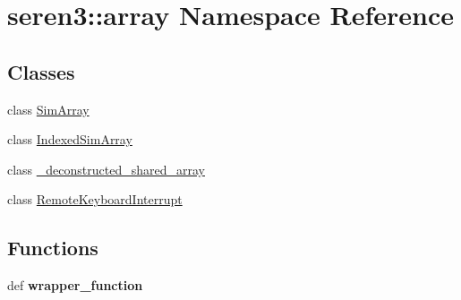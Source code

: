 \hypertarget{namespaceseren3_1_1array}{
\section{seren3::array Namespace Reference}
\label{namespaceseren3_1_1array}
}
\subsection*{Classes}
\begin{DoxyCompactItemize}
\item 
class \hyperlink{classseren3_1_1array_1_1SimArray}{SimArray}
\item 
class \hyperlink{classseren3_1_1array_1_1IndexedSimArray}{IndexedSimArray}
\item 
class \hyperlink{classseren3_1_1array_1_1__deconstructed__shared__array}{\_\-deconstructed\_\-shared\_\-array}
\item 
class \hyperlink{classseren3_1_1array_1_1RemoteKeyboardInterrupt}{RemoteKeyboardInterrupt}
\end{DoxyCompactItemize}
\subsection*{Functions}
\begin{DoxyCompactItemize}
\item 
\hypertarget{namespaceseren3_1_1array_ab0610d280c11a820fde70051e14ab10f}{
def {\bfseries wrapper\_\-function}}
\label{namespaceseren3_1_1array_ab0610d280c11a820fde70051e14ab10f}

\end{DoxyCompactItemize}
